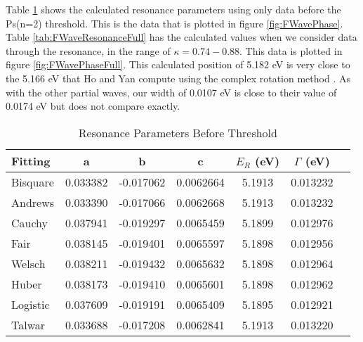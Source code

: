\documentclass[Dissertation.tex]{subfiles}
\begin{document}
Table \ref{tab:FWaveResonanceBefore} shows the calculated resonance parameters using only data before the Ps(n=2) threshold. This is the data that is plotted in figure \ref{fig:FWavePhase}. Table \ref{tab:FWaveResonanceFull} has the calculated values when we consider data through the resonance, in the range of $\kappa = 0.74 - 0.88$. This data is plotted in figure \ref{fig:FWavePhaseFull}. This calculated position of 5.182 eV is very close to the 5.166 eV that Ho and Yan compute using the complex rotation method \cite{Ho2000}. As with the other partial waves, our width of 0.0107 eV is close to their value of 0.0174 eV but does not compare exactly.


\setlength{\abovecaptionskip}{6pt}
\setlength{\belowcaptionskip}{6pt}
\begin{table}[H]
\centering
\begin{tabular}{l c c c c c c}
\toprule
Fitting & a & b & c & $E_R$ (eV) & $\Gamma$ (eV) \\
\midrule
Bisquare	& 0.033382 & -0.017062 & 0.0062664 & 5.1913 & 0.013232 \\
Andrews		& 0.033390 & -0.017066 & 0.0062668 & 5.1913 & 0.013232 \\
Cauchy		& 0.037941 & -0.019297 & 0.0065459 & 5.1899 & 0.012976 \\
Fair			& 0.038145 & -0.019401 & 0.0065597 & 5.1898 & 0.012956 \\
Welsch		& 0.038211 & -0.019432 & 0.0065632 & 5.1898 & 0.012964 \\
Huber			& 0.038173 & -0.019410 & 0.0065601 & 5.1898 & 0.012962 \\
Logistic	& 0.037609 & -0.019191 & 0.0065409 & 5.1895 & 0.012921 \\
Talwar		& 0.033688 & -0.017208 & 0.0062841 & 5.1913 & 0.013220 \\
\bottomrule
\end{tabular}
\caption{Resonance Parameters Before Threshold} %
\label{tab:FWaveResonanceBefore}
\end{table}
\end{document}
